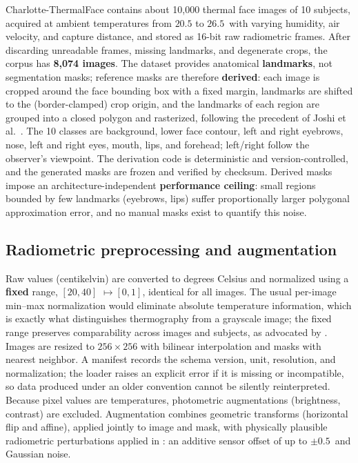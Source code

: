 Charlotte-ThermalFace \cite{Ashrafi2022} contains about 10{,}000 thermal face images of 10 subjects, acquired at ambient temperatures from $20.5$ to $26.5$\,\degC{} with varying humidity, air velocity, and capture distance, and stored as 16-bit raw radiometric frames.
After discarding unreadable frames, missing landmarks, and degenerate crops, the corpus has \textbf{8{,}074 images}.
The dataset provides anatomical \textbf{landmarks}, not segmentation masks; reference masks are therefore \textbf{derived}: each image is cropped around the face bounding box with a fixed margin, landmarks are shifted to the (border-clamped) crop origin, and the landmarks of each region are grouped into a closed polygon and rasterized, following the precedent of Joshi et al.~\cite{Joshi2022}.
The 10 classes are background, lower face contour, left and right eyebrows, nose, left and right eyes, mouth, lips, and forehead; left/right follow the observer's viewpoint.
The derivation code is deterministic and version-controlled, and the generated masks are frozen and verified by checksum.
Derived masks impose an architecture-independent \textbf{performance ceiling}: small regions bounded by few landmarks (eyebrows, lips) suffer proportionally larger polygonal approximation error, and no manual masks exist to quantify this noise.

\subsection{Radiometric preprocessing and augmentation} \label{sec:preprocessamento_radiometrico}

Raw values (centikelvin) are converted to degrees Celsius and normalized using a \textbf{fixed} range, $[20, 40]$\,\degC{}$\,\mapsto[0,1]$, identical for all images.
The usual per-image min--max normalization would eliminate absolute temperature information, which is exactly what distinguishes thermography from a grayscale image; the fixed range preserves comparability across images and subjects, as advocated by \cite{Joshi2022}.
Images are resized to $256\times256$ with bilinear interpolation and masks with nearest neighbor.
A manifest records the schema version, unit, resolution, and normalization; the loader raises an explicit error if it is missing or incompatible, so data produced under an older convention cannot be silently reinterpreted.
Because pixel values are temperatures, photometric augmentations (brightness, contrast) are excluded.
Augmentation combines geometric transforms (horizontal flip and affine), applied jointly to image and mask, with physically plausible radiometric perturbations applied in \degC{}: an additive sensor offset of up to $\pm0.5$\,\degC{} and Gaussian noise.

